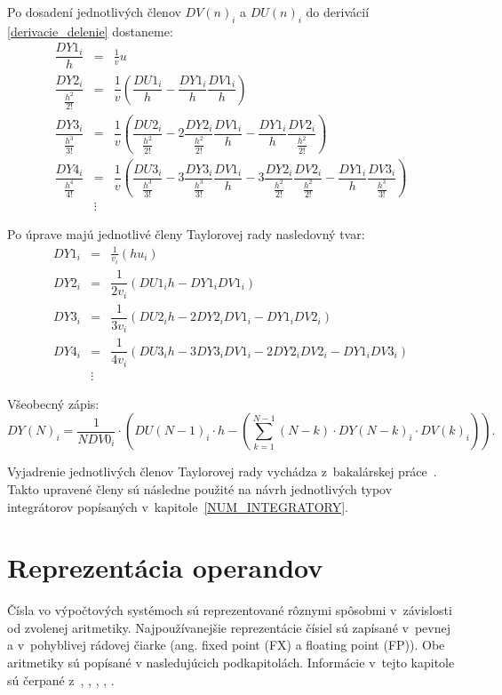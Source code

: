 Po dosadení jednotlivých členov $ DV(n)_{i} $ a $ DU(n)_{i} $ do derivácií \eqref{derivacie_delenie} dostaneme:
\begin{eqnarray}
\dfrac{DY1_{i}}{h} & = & \frac{1}{v} u~\\
\dfrac{DY2_{i}}{\frac{h^{2}}{2!}} & = & \dfrac{1}{v} ( \dfrac{DU1_{i}}{h} - \dfrac{DY1_{i}}{h}\dfrac{DV1_{i}}{h} ) \nonumber \\
\dfrac{DY3_{i}}{\frac{h^{3}}{3!}} & = & \dfrac{1}{v} 
( \dfrac{DU2_{i}}{\frac{h^{2}}{2!}} - 
2\dfrac{DY2_{i}}{\frac{h^{2}}{2!}} \dfrac{DV1_{i}}{h} - 
\dfrac{DY1_{i}}{h} \dfrac{DV2_{i}}{\frac{h^{2}}{2!}} ) \nonumber \\
\dfrac{DY4_{i}}{\frac{h^{4}}{4!}} & = & \dfrac{1}{v} 
( \dfrac{DU3_{i}}{\frac{h^{3}}{3!}} - 
3\dfrac{DY3_{i}}{\frac{h^{3}}{3!}} \dfrac{DV1_{i}}{h} - 
3\dfrac{DY2_{i}}{\frac{h^{2}}{2!}} \dfrac{DV2_{i}}{\frac{h^{2}}{2!}} -
\dfrac{DY1_{i}}{h} \dfrac{DV3_{i}}{\frac{h^{3}}{3!}} ) \nonumber \\
& \vdots \nonumber & 
\end{eqnarray}


Po úprave majú jednotlivé členy Taylorovej rady nasledovný tvar:
\begin{eqnarray}
DY1_{i} & = & \frac{1}{v_{i}} (hu_{i}) \label{DY1_cleny_delenia} \\
DY2_{i} & = & \dfrac{1}{2v_{i}} (DU1_{i}h - DY1_{i}DV1_{i}) \label{DY2_cleny_delenia} \\
DY3_{i} & = & \dfrac{1}{3v_{i}} ( DU2_{i}h - 2DY2_{i}DV1_{i} - DY1_{i}DV2_{i} ) \label{DY3_cleny_delenia} \\
DY4_{i} & = & \dfrac{1}{4v_{i}} ( DU3_{i}h - 3DY3_{i}DV1_{i} - 2DY2_{i}DV2_{i} - DY1_{i}DV3_{i} ) \label{DY4_cleny_delenia} \\ 
& \vdots \nonumber & 
\end{eqnarray}

Všeobecný zápis:
\begin{equation}
DY(N)_{i} = \dfrac{1}{N DV0_{i}} \cdot \left( DU(N-1)_{i} \cdot h - \left( \sum_{k=1}^{N-1} (N-k) \cdot DY(N-k)_{i} \cdot DV(k)_{i} \right) \right)  .\label{suma_div}
\end{equation}
\bigskip

Vyjadrenie jednotlivých členov Taylorovej rady vychádza z~bakalárskej práce~\cite{MatecnyBP}. Takto upravené členy sú následne použité na návrh jednotlivých typov integrátorov popísaných v~kapitole~\ref{NUM_INTEGRATORY}.



\chapter{Reprezentácia operandov} \label{REPREZENTACIA_OPERANDOV}
Čísla vo výpočtových systémoch sú reprezentované rôznymi spôsobmi v~závislosti od zvolenej aritmetiky. Najpoužívanejšie reprezentácie čísiel sú zapísané v~pevnej a v~pohyblivej rádovej čiarke (ang. fixed point (FX) a floating point (FP)). Obe aritmetiky sú popísané v nasledujúcich podkapitolách. Informácie v~tejto kapitole sú čerpané z~\cite{FXOnline}, \cite{FPOnline}, \cite{KrausDisP}, \cite{inpFP}, \cite{inpRepDat}.


